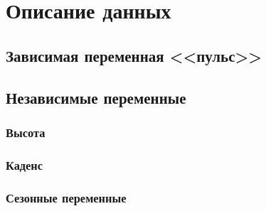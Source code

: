 \documentclass[a4paper,12pt]{article}
\begin{document}

\tableofcontents
\pagebreak

\section{Описание данных}

\subsection{Зависимая переменная <<пульс>>}

\subsection{Независимые переменные}
\subsubsection{Высота}

\subsubsection{Каденс}

\subsubsection{Сезонные переменные}
\end{document}
